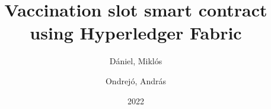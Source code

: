 \author{
  Dániel, Miklós\\
  \and
  Ondrejó, András\\
}

\title{Vaccination slot smart contract using Hyperledger Fabric}
\date{2022}